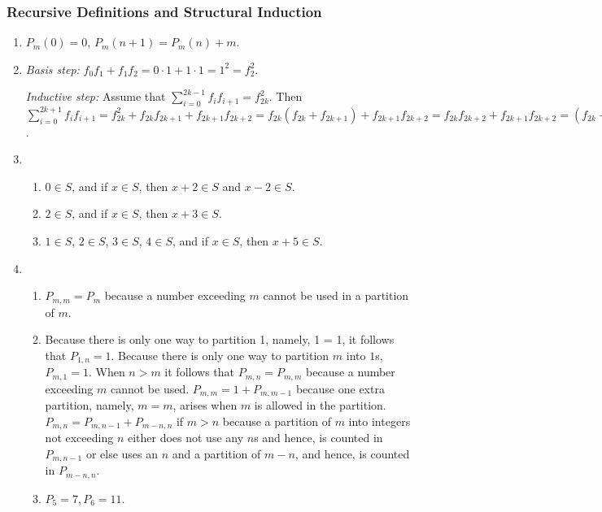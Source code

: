 \documentclass{../../cls/sig-alternate-05-2015}
\begin{document}
\subsubsection{Recursive Definitions and Structural Induction}
\begin{enumerate}
\item $P_m(0) = 0$, $P_m(n + 1) = P_m(n) + m$.
	
	
\item \textit{Basis step:} $f_0 f_1 + f_1 f_2 = 0 \cdot 1 + 1 \cdot 1 = 1^2 = f_2^2$.

\textit{Inductive step:} Assume that $\sum_{i = 0}^{2k - 1} f_i f_{i + 1} = f_{2k}^2$.
Then $\sum_{i = 0}^{2k + 1} f_i f_{i + 1} = f_{2k}^2 + f_{2k} f_{2k + 1} + f_{2k + 1} f_{2k + 2} = f_{2k} (f_{2k} + f_{2k + 1}) + f_{2k + 1} f_{2k + 2} = f_{2k} f_{2k + 2} + f_{2k + 1} f_{2k + 2} = (f_{2k} + f_{2k + 1}) f_{2k + 2} = f_{2k + 2}^2$.


\item
\begin{enumerate}
	\item $0 \in S$, and if $x \in S$, then $x + 2 \in S$
	and $x - 2 \in S$. 
	\item $2 \in S$, and if $x \in S$, then $x + 3 \in S$.
	\item $1 \in S$, $2 \in S$, $3 \in S$, $4 \in S$, and if $x \in S$, then $x + 5 \in S$.
\end{enumerate}


\item \begin{enumerate}
    \item $P_{m, m} = P_m$ because a number exceeding $m$ cannot be used in a partition of $m$.
    \item Because there is only one way to partition 1, namely, 1 = 1, it follows that $P_{1,n} = 1$.
    Because there is only one way to partition $m$ into $1$s, $P_{m,1} = 1$. When $n > m$ it follows that $P_{m, n} = P_{m, m}$ because a number exceeding $m$ cannot be used.
    $P_{m, m} = 1 + P_{m, m - 1}$ because one extra partition,
    namely, $m = m$,
    arises when $m$ is allowed in the partition.
    $P_{m, n} = P_{m, n - 1} + P_{m - n, n}$ if $m > n$ because a partition of $m$ into integers not exceeding $n$ either does not use any $n$s and hence,
    is counted in $P_{m, n - 1}$ or else uses an $n$ and a partition of $m - n$, and hence, is counted in $P_{m - n, n}$.
    \item $P_5 = 7, P_6 = 11$.
\end{enumerate}


\end{enumerate}
\end{document}
